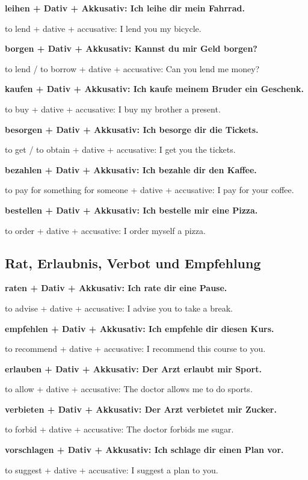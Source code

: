 \documentclass[a4paper]{article}
\newcommand{\EN}[1]{\par{\small\textcolor{TranslationGray}{#1}}\vspace{0.4em}}
\begin{document}
            \textbf{leihen + Dativ + Akkusativ: Ich leihe dir mein Fahrrad.}
            \EN{to lend + dative + accusative: I lend you my bicycle.}
            
            \textbf{borgen + Dativ + Akkusativ: Kannst du mir Geld borgen?}
            \EN{to lend / to borrow + dative + accusative: Can you lend me money?}
            
            \textbf{kaufen + Dativ + Akkusativ: Ich kaufe meinem Bruder ein Geschenk.}
            \EN{to buy + dative + accusative: I buy my brother a present.}
            
            \textbf{besorgen + Dativ + Akkusativ: Ich besorge dir die Tickets.}
            \EN{to get / to obtain + dative + accusative: I get you the tickets.}
            
            \textbf{bezahlen + Dativ + Akkusativ: Ich bezahle dir den Kaffee.}
            \EN{to pay for something for someone + dative + accusative: I pay for your coffee.}
            
            \textbf{bestellen + Dativ + Akkusativ: Ich bestelle mir eine Pizza.}
            \EN{to order + dative + accusative: I order myself a pizza.}
        
        \subsection{Rat, Erlaubnis, Verbot und Empfehlung}
            
            \textbf{raten + Dativ + Akkusativ: Ich rate dir eine Pause.}
            \EN{to advise + dative + accusative: I advise you to take a break.}
            
            \textbf{empfehlen + Dativ + Akkusativ: Ich empfehle dir diesen Kurs.}
            \EN{to recommend + dative + accusative: I recommend this course to you.}
            
            \textbf{erlauben + Dativ + Akkusativ: Der Arzt erlaubt mir Sport.}
            \EN{to allow + dative + accusative: The doctor allows me to do sports.}
            
            \textbf{verbieten + Dativ + Akkusativ: Der Arzt verbietet mir Zucker.}
            \EN{to forbid + dative + accusative: The doctor forbids me sugar.}
            
            \textbf{vorschlagen + Dativ + Akkusativ: Ich schlage dir einen Plan vor.}
            \EN{to suggest + dative + accusative: I suggest a plan to you.}
            
\end{document}
